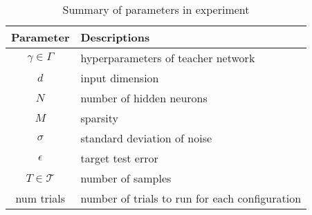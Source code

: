 \documentclass[twoside,11pt]{article}
\begin{document}
\begin{table}[htbp]
  \begin{center}
    \begin{tabular}{ c l}
      \hline
      Parameter                        & Descriptions                              
      \\ \hline
      $\gamma\in\Gamma$ & hyperparameters of teacher network          
      \\
      $d$                              & input dimension            
      \\
      $N$                              & number of hidden neurons       
      \\
      $M$                              & sparsity                 
      \\
      $\sigma$                         & standard deviation of noise         
      \\ \hline
      $\epsilon$                       & target test error             
      \\ \hline
      $T\in\mathcal{T}$                & number of samples  
      \\ \hline
      num trials                       & number of trials to run for each configuration 
      \\ \hline
    \end{tabular}
  \end{center}
  \caption{Summary of parameters in experiment}
  \label{tab:exp-params}
\end{table}
\end{document}
